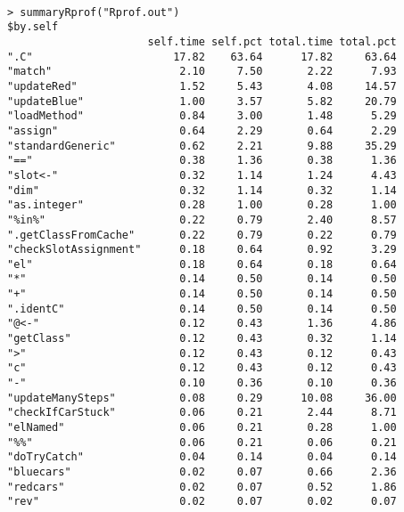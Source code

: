 \documentclass[11pt]{article}
\begin{document}
\begin{verbatim}

> summaryRprof("Rprof.out")
$by.self
                      self.time self.pct total.time total.pct
".C"                      17.82    63.64      17.82     63.64
"match"                    2.10     7.50       2.22      7.93
"updateRed"                1.52     5.43       4.08     14.57
"updateBlue"               1.00     3.57       5.82     20.79
"loadMethod"               0.84     3.00       1.48      5.29
"assign"                   0.64     2.29       0.64      2.29
"standardGeneric"          0.62     2.21       9.88     35.29
"=="                       0.38     1.36       0.38      1.36
"slot<-"                   0.32     1.14       1.24      4.43
"dim"                      0.32     1.14       0.32      1.14
"as.integer"               0.28     1.00       0.28      1.00
"%in%"                     0.22     0.79       2.40      8.57
".getClassFromCache"       0.22     0.79       0.22      0.79
"checkSlotAssignment"      0.18     0.64       0.92      3.29
"el"                       0.18     0.64       0.18      0.64
"*"                        0.14     0.50       0.14      0.50
"+"                        0.14     0.50       0.14      0.50
".identC"                  0.14     0.50       0.14      0.50
"@<-"                      0.12     0.43       1.36      4.86
"getClass"                 0.12     0.43       0.32      1.14
">"                        0.12     0.43       0.12      0.43
"c"                        0.12     0.43       0.12      0.43
"-"                        0.10     0.36       0.10      0.36
"updateManySteps"          0.08     0.29      10.08     36.00
"checkIfCarStuck"          0.06     0.21       2.44      8.71
"elNamed"                  0.06     0.21       0.28      1.00
"%%"                       0.06     0.21       0.06      0.21
"doTryCatch"               0.04     0.14       0.04      0.14
"bluecars"                 0.02     0.07       0.66      2.36
"redcars"                  0.02     0.07       0.52      1.86
"rev"                      0.02     0.07       0.02      0.07


\end{verbatim}
\end{document}
